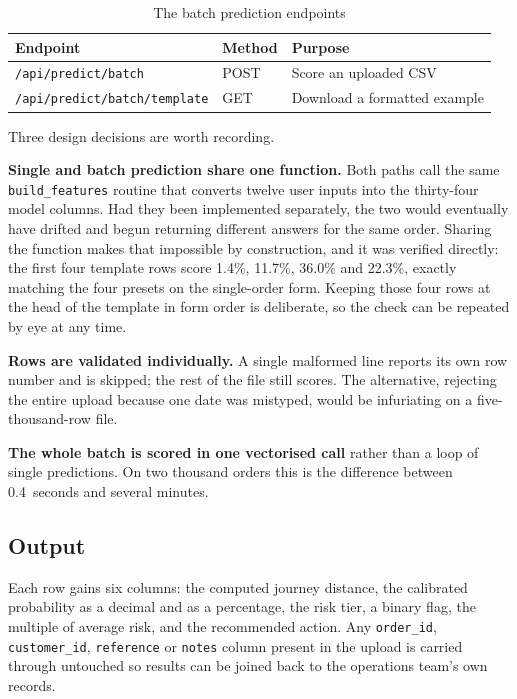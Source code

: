 \documentclass[11pt,a4paper]{report}
\begin{document}
\begin{table}[H]
\centering
\caption{The batch prediction endpoints}
\begin{tabular}{@{}lll@{}}
\toprule
\textbf{Endpoint} & \textbf{Method} & \textbf{Purpose} \\
\midrule
\texttt{/api/predict/batch} & POST & Score an uploaded CSV \\
\texttt{/api/predict/batch/template} & GET & Download a formatted example \\
\bottomrule
\end{tabular}
\end{table}

Three design decisions are worth recording.

\textbf{Single and batch prediction share one function.} Both paths call the
same \texttt{build\_features} routine that converts twelve user inputs into the
thirty-four model columns. Had they been implemented separately, the two would
eventually have drifted and begun returning different answers for the same
order. Sharing the function makes that impossible by construction, and it was
verified directly: the first four template rows score 1.4\%, 11.7\%, 36.0\% and
22.3\%, exactly matching the four presets on the single-order form. Keeping
those four rows at the head of the template in form order is deliberate, so the
check can be repeated by eye at any time.

\textbf{Rows are validated individually.} A single malformed line reports its
own row number and is skipped; the rest of the file still scores. The
alternative, rejecting the entire upload because one date was mistyped, would
be infuriating on a five-thousand-row file.

\textbf{The whole batch is scored in one vectorised call} rather than a loop of
single predictions. On two thousand orders this is the difference between
0.4~seconds and several minutes.

\subsection{Output}

Each row gains six columns: the computed journey distance, the calibrated
probability as a decimal and as a percentage, the risk tier, a binary flag, the
multiple of average risk, and the recommended action. Any \texttt{order\_id},
\texttt{customer\_id}, \texttt{reference} or \texttt{notes} column present in
the upload is carried through untouched so results can be joined back to the
operations team's own records.
\end{document}
